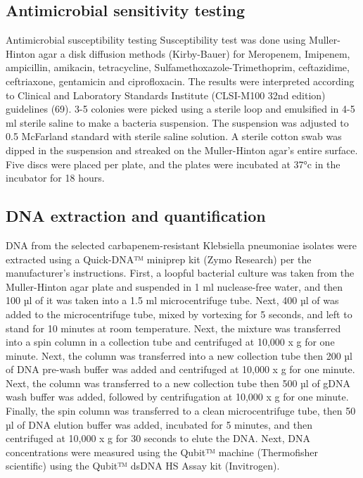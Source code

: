 \documentclass[preprint, 3p,
authoryear]{elsarticle} %
\begin{document}
\subsection{Antimicrobial sensitivity
testing}\label{antimicrobial-sensitivity-testing}

Antimicrobial susceptibility testing Susceptibility test was done using
Muller-Hinton agar a disk diffusion methods (Kirby-Bauer) for Meropenem,
Imipenem, ampicillin, amikacin, tetracycline,
Sulfamethoxazole-Trimethoprim, ceftazidime, ceftriaxone, gentamicin and
ciprofloxacin. The results were interpreted according to Clinical and
Laboratory Standards Institute (CLSI-M100 32nd edition) guidelines (69).
3-5 colonies were picked using a sterile loop and emulsified in 4-5 ml
sterile saline to make a bacteria suspension. The suspension was
adjusted to 0.5 McFarland standard with sterile saline solution. A
sterile cotton swab was dipped in the suspension and streaked on the
Muller-Hinton agar's entire surface. Five discs were placed per plate,
and the plates were incubated at 37°c in the incubator for 18 hours.

\subsection{DNA extraction and
quantification}\label{dna-extraction-and-quantification}

DNA from the selected carbapenem-resistant Klebsiella pneumoniae
isolates were extracted using a Quick-DNA™ miniprep kit (Zymo Research)
per the manufacturer's instructions. First, a loopful bacterial culture
was taken from the Muller-Hinton agar plate and suspended in 1 ml
nuclease-free water, and then 100 µl of it was taken into a 1.5 ml
microcentrifuge tube. Next, 400 µl of was added to the microcentrifuge
tube, mixed by vortexing for 5 seconds, and left to stand for 10 minutes
at room temperature. Next, the mixture was transferred into a spin
column in a collection tube and centrifuged at 10,000 x g for one
minute. Next, the column was transferred into a new collection tube then
200 µl of DNA pre-wash buffer was added and centrifuged at 10,000 x g
for one minute. Next, the column was transferred to a new collection
tube then 500 µl of gDNA wash buffer was added, followed by
centrifugation at 10,000 x g for one minute. Finally, the spin column
was transferred to a clean microcentrifuge tube, then 50 µl of DNA
elution buffer was added, incubated for 5 minutes, and then centrifuged
at 10,000 x g for 30 seconds to elute the DNA. Next, DNA concentrations
were measured using the Qubit™ machine (Thermofisher scientific) using
the Qubit™ dsDNA HS Assay kit (Invitrogen).
\end{document}
